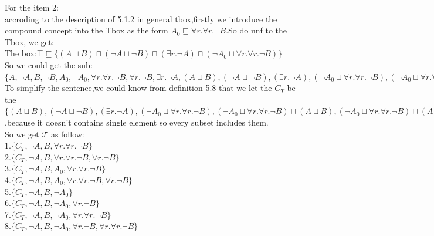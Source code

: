 \documentclass{article}
\begin{document}
    For the item 2:\\
    accroding to the description of 5.1.2 in general tbox,firstly we introduce the compound concept into the Tbox as the form $A_0\sqsubseteq \forall r.\forall r.\neg B$.So do nnf
    to the Tbox, we get:\\
    The box:$\top \sqsubseteq \{(A\sqcup B)\sqcap (\neg A \sqcup \neg B)\sqcap (\exists r.\neg A)\sqcap (\neg A_0 \sqcup \forall r.\forall r.\neg B)\}$\\
    So we could get the sub:$\{A,\neg A,B,\neg B,A_0,\neg A_0,\forall r.\forall r.\neg B,\forall r.\neg B,\exists r.\neg A, 
    (A\sqcup B), (\neg A \sqcup \neg B),(\exists r.\neg A), (\neg A_0 \sqcup \forall r.\forall r.\neg B),
    (\neg A_0 \sqcup \forall r.\forall r.\neg B)\sqcap (A\sqcup B),
    (\neg A_0 \sqcup \forall r.\forall r.\neg B)\sqcap (A\sqcup B)\sqcap (\neg A \sqcup \neg B),
    (\neg A_0 \sqcup \forall r.\forall r.\neg B)\sqcap (A\sqcup B)\sqcap (\neg A \sqcup \neg B)\sqcap  (\neg A_0 \sqcup \forall r.\forall r.\neg B)\}$\\
    To simplify the sentence,we could know from definition 5.8 that we let the $C_T$ be the $\{(A\sqcup B), (\neg A \sqcup \neg B),(\exists r.\neg A), (\neg A_0 \sqcup \forall r.\forall r.\neg B),
    (\neg A_0 \sqcup \forall r.\forall r.\neg B)\sqcap (A\sqcup B),
    (\neg A_0 \sqcup \forall r.\forall r.\neg B)\sqcap (A\sqcup B)\sqcap (\neg A \sqcup \neg B),
    (\neg A_0 \sqcup \forall r.\forall r.\neg B)\sqcap (A\sqcup B)\sqcap (\neg A \sqcup \neg B)\sqcap  (\neg A_0 \sqcup \forall r.\forall r.\neg B)\}$,because it doesn't contains single element so every subset includes them.\\
    So we get $\mathcal{T}$ as follow:\\
    1.$\{C_T,\neg A, B, \forall r.\forall r.\neg B\}$\\
    2.$\{C_T,\neg A, B, \forall r.\forall r.\neg B, \forall r.\neg B\}$\\
    3.$\{C_T,\neg A, B, A_0, \forall r.\forall r.\neg B\}$\\
    4.$\{C_T,\neg A, B, A_0, \forall r.\forall r.\neg B,\forall r.\neg B\}$\\
    5.$\{C_T,\neg A, B, \neg A_0\}$\\
    6.$\{C_T,\neg A, B, \neg A_0, \forall r.\neg B\}$\\
    7.$\{C_T,\neg A, B, \neg A_0, \forall r.\forall r.\neg B\}$\\
    8.$\{C_T,\neg A, B, \neg A_0, \forall r.\neg B,\forall r.\forall r.\neg B\}$\\
\end{document}

